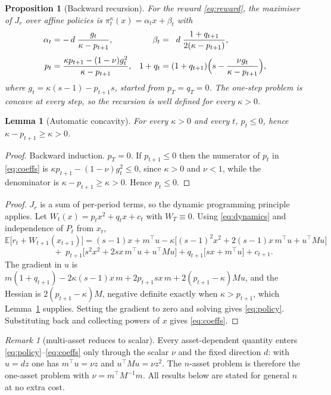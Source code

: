 \documentclass[11pt,a4paper]{article}
\theoremstyle{plain}
\newtheorem{proposition}[theorem]{Proposition}
\newtheorem{lemma}[theorem]{Lemma}
\theoremstyle{definition}
\theoremstyle{remark}
\newtheorem{remark}[theorem]{Remark}
\newcommand{\E}{\mathbb{E}}
\newcommand{\pir}{\pi^{\kappa}}
\begin{document}
\begin{proposition}[Backward recursion]\label{prop:recursion}
For the reward \eqref{eq:reward}, the maximiser of $J_r$ over affine policies is
$\pir_t(x)=\alpha_tx+\beta_t$ with
\begin{align}
\alpha_t&=-\,d\;\frac{g_t}{\kappa-p_{t+1}}, &
\beta_t&=\;\;d\;\frac{1+q_{t+1}}{2(\kappa-p_{t+1})},
\label{eq:policy}\\[0.3em]
p_t&=\frac{\kappa p_{t+1}-(1-\nu)g_t^{2}}{\kappa-p_{t+1}}, &
1+q_t&=(1+q_{t+1})\Bigl(s-\frac{\nu g_t}{\kappa-p_{t+1}}\Bigr),
\label{eq:coeffs}
\end{align}
where $g_t=\kappa(s-1)-p_{t+1}s$, started from $p_T=q_T=0$. The one-step problem
is concave at every step, so the recursion is well defined for every
$\kappa>0$.
\end{proposition}

\begin{lemma}[Automatic concavity]\label{lem:concave}
For every $\kappa>0$ and every $t$, $p_t\le0$, hence $\kappa-p_{t+1}\ge\kappa>0$.
\end{lemma}

\begin{proof}
Backward induction. $p_T=0$. If $p_{t+1}\le0$ then the numerator of $p_t$ in
\eqref{eq:coeffs} is $\kappa p_{t+1}-(1-\nu)g_t^{2}\le0$, since $\kappa>0$ and
$\nu<1$, while the denominator is $\kappa-p_{t+1}\ge\kappa>0$. Hence $p_t\le0$.
\end{proof}

\begin{proof}
$J_r$ is a sum of per-period terms, so the dynamic programming principle applies.
Let $W_t(x)=p_tx^2+q_tx+c_t$ with $W_T\equiv0$. Using \eqref{eq:dynamics} and
independence of $P_t$ from $x_t$,
\[
\E\bigl[r_t+W_{t+1}(x_{t+1})\bigr]
=(s-1)x+m^{\top}u-\kappa\bigl[(s-1)^2x^2+2(s-1)x\,m^{\top}u+u^{\top}Mu\bigr]
\]
\[
\qquad+\;p_{t+1}\bigl[s^2x^2+2sx\,m^{\top}u+u^{\top}Mu\bigr]
+q_{t+1}\bigl[sx+m^{\top}u\bigr]+c_{t+1}.
\]
The gradient in $u$ is
$m(1+q_{t+1})-2\kappa(s-1)x\,m+2p_{t+1}sx\,m+2(p_{t+1}-\kappa)Mu$, and the
Hessian is $2(p_{t+1}-\kappa)M$, negative definite exactly when
$\kappa>p_{t+1}$, which Lemma~\ref{lem:concave} supplies. Setting the gradient
to zero and solving gives
\eqref{eq:policy}. Substituting back and collecting powers of $x$ gives
\eqref{eq:coeffs}.
\end{proof}

\begin{remark}[multi-asset reduces to scalar]\label{rem:scalar}
Every asset-dependent quantity enters \eqref{eq:policy}--\eqref{eq:coeffs} only
through the scalar $\nu$ and the fixed direction $d$: with $u=dz$ one has
$m^{\top}u=\nu z$ and $u^{\top}Mu=\nu z^{2}$. The $n$-asset problem is therefore
the one-asset problem with $\nu=m^{\top}M^{-1}m$. All results below are stated
for general $n$ at no extra cost.
\end{remark}
\end{document}
